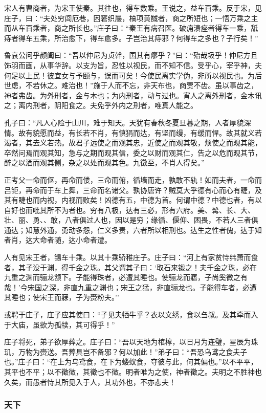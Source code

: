 \documentclass[]{article}
\begin{document}
宋人有曹商者，为宋王使秦。其往也，得车数乘。王说之，益车百乘。反于宋，见庄子，曰：``夫处穷闾厄巷，困窘织屦，槁项黄馘者，商之所短也；一悟万乘之主而从车百乘者，商之所长也。''庄子曰：``秦王有病召医。破痈溃痤者得车一乘，舐痔者得车五乘，所治愈下，得车愈多。子岂治其痔邪？何得车之多也？子行矣！''

鲁哀公问乎颜阖曰：``吾以仲尼为贞幹，国其有瘳乎？''曰：``殆哉圾乎！仲尼方且饰羽而画，从事华辞。以支为旨，忍性以视民，而不知不信。受乎心，宰乎神，夫何足以上民！彼宜女与予颐与，误而可矣！今使民离实学伪，非所以视民也。为后世虑，不若休之。难治也！''施于人而不忘，非天布也，商贾不齿。虽以事齿之，神者弗齿。为外刑者，金与木也；为内刑者，动与过也。宵人之离外刑者，金木讯之；离内刑者，阴阳食之。夫免乎外内之刑者，唯真人能之。

孔子曰：``凡人心险于山川，难于知天。天犹有春秋冬夏旦暮之期，人者厚貌深情。故有貌愿而益，有长若不肖，有慎狷而达，有坚而缦，有缓而悍。故其就义若渴者，其去义若热。故君子远使之而观其忠，近使之而观其敬，烦使之而观其能，卒然问焉而观其知，急与之期而观其信，委之以财而观其仁，告之以危而观其节，醉之以酒而观其侧，杂之以处而观其色。九徵至，不肖人得矣。''

正考父一命而伛，再命而偻，三命而俯，循墙而走，孰敢不轨！如而夫者，一命而吕钜，再命而于车上舞，三命而名诸父。孰协唐许？贼莫大乎德有心而心有睫，及其有睫也而内视，内视而败矣！凶德有五，中德为首。何谓中德？中德也者，有以自好也而吡其所不为者也。穷有八极，达有三必，形有六府。美、髯、长、大、壮、丽、勇、、敢，八者俱过人也，因以是穷；缘循、偃仰、困畏，不若人三者俱通达；知慧外通，勇动多怨，仁义多责，六者所以相刑也。达生之性者傀，达于知者肖，达大命者随，达小命者遭。

人有见宋王者，锡车十乘。以其十乘骄稚庄子。庄子曰：``河上有家贫恃纬萧而食者，其子没于渊，得千金之珠。其父谓其子曰：`取石来锻之！夫千金之珠，必在九重之渊而骊龙颔下。子能得珠者，必遭其睡也。使骊龙而寤，子尚奚微之有哉！'今宋国之深，非直九重之渊也；宋王之猛，非直骊龙也。子能得车者，必遭其睡也；使宋王而寐，子为赍粉夫。''

或聘于庄子，庄子应其使曰：``子见夫牺牛乎？衣以文绣，食以刍叔。及其牵而入于大庙，虽欲为孤犊，其可得乎！''

庄子将死，弟子欲厚葬之。庄子曰：``吾以天地为棺椁，以日月为连璧，星辰为珠玑，万物为赍送。吾葬具岂不备邪？何以加此！''弟子曰：``吾恐乌鸢之食夫子也。''庄子曰：``在上为乌鸢食，在下为蝼蚁食，夺彼与此，何其偏也。''以不平平，其平也不平；以不徵徵，其徵也不徵。明者唯为之使，神者徵之。夫明之不胜神也久矣，而愚者恃其所见入于人，其功外也，不亦悲夫！

\hypertarget{header-n514}{%
\subsubsection{天下}\label{header-n514}}
\end{document}
